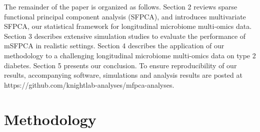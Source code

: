 \documentclass[aoas,preprint]{imsart}
\begin{document}
The remainder of the paper is organized as follows. Section 2 reviews sparse functional principal component analysis (SFPCA), and introduces multivariate SFPCA, our statistical framework for longitudinal microbiome multi-omics data. Section 3 describes extensive simulation studies to evaluate the performance of mSFPCA in realistic settings. Section 4 describes the application of our methodology to a challenging longitudinal microbiome multi-omics data on type 2 diabetes. Section 5 presents our conclusion. To ensure reproducibility of our results, accompanying software, simulations and analysis results are posted at https://github.com/knightlab-analyses/mfpca-analyses. 


\section{Methodology}
\end{document}
